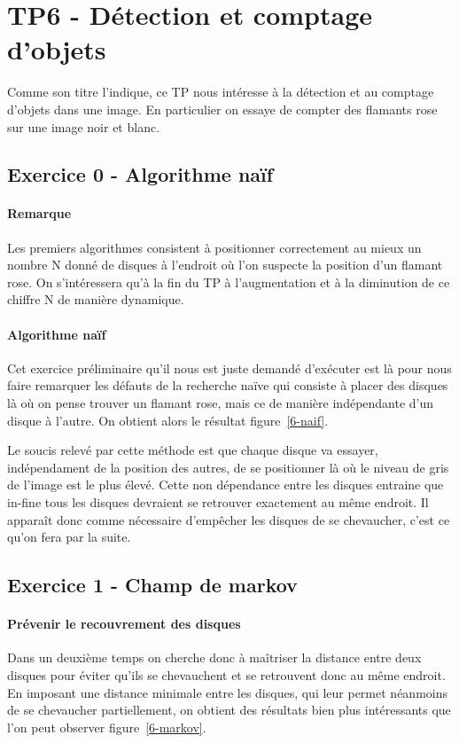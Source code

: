 \section{TP6 - Détection et comptage d'objets}
Comme son titre l'indique, ce TP nous intéresse à la détection et au comptage d'objets dans une image. En particulier on essaye de compter des flamants rose sur une image noir et blanc.

\subsection{Exercice 0 - Algorithme naïf}
\paragraph{Remarque}
Les premiers algorithmes consistent à positionner correctement au mieux un nombre N donné de disques à l'endroit où l'on suspecte la position d'un flamant rose. On s'intéressera qu'à la fin du TP à l'augmentation et à la diminution de ce chiffre N de manière dynamique.

\paragraph{Algorithme naïf}
Cet exercice préliminaire qu'il nous est juste demandé d'exécuter est là pour nous faire remarquer les défauts de la recherche naïve qui consiste à placer des disques là où on pense trouver un flamant rose, mais ce de manière indépendante d'un disque à l'autre. On obtient alors le résultat figure~\ref{6-naif}.

\begin{figure}
\end{figure}

Le soucis relevé par cette méthode est que chaque disque va essayer, indépendament de la position des autres, de se positionner là où le niveau de gris de l'image est le plus élevé. Cette non dépendance entre les disques entraine que in-fine tous les disques devraient se retrouver exactement au même endroit. Il apparaît donc comme nécessaire d'empêcher les disques de se chevaucher, c'est ce qu'on fera par la suite.

\subsection{Exercice 1 - Champ de markov}
\paragraph{Prévenir le recouvrement des disques}
Dans un deuxième temps on cherche donc à maîtriser la distance entre deux disques pour éviter qu'ils se chevauchent et se retrouvent donc au même endroit. En imposant une distance minimale entre les disques, qui leur permet néanmoins de se chevaucher partiellement, on obtient des résultats bien plus intéressants que l'on peut observer figure~\ref{6-markov}.

